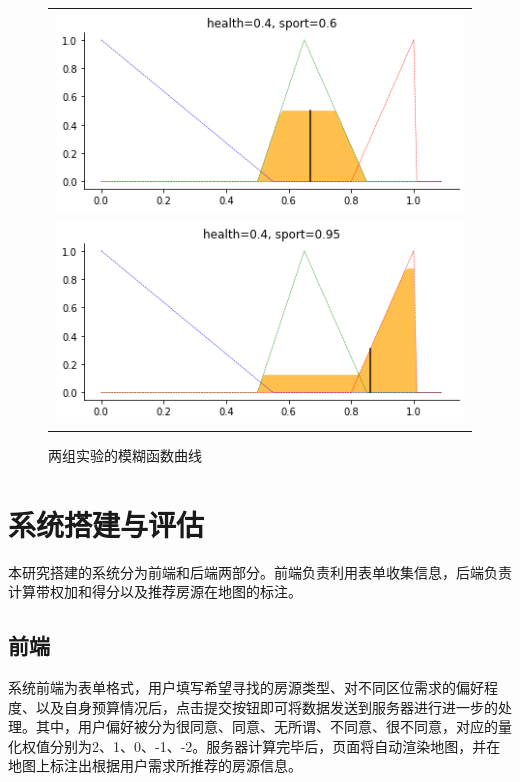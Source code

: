 \documentclass{article}
\begin{document}
\begin{figure}[htbp]
\centering
    \begin{tabular}{c}
        \includegraphics[width=\textwidth]{./pic/实验1.png} \\
        \includegraphics[width=\textwidth]{./pic/实验2.png}
    \end{tabular}
\caption{两组实验的模糊函数曲线}
\label{实验}
\end{figure}

\section{系统搭建与评估}

本研究搭建的系统分为前端和后端两部分。前端负责利用表单收集信息，后端负责计算带权加和得分以及推荐房源在地图的标注。

\subsection{前端}

系统前端为表单格式，用户填写希望寻找的房源类型、对不同区位需求的偏好程度、以及自身预算情况后，点击提交按钮即可将数据发送到服务器进行进一步的处理。其中，用户偏好被分为很同意、同意、无所谓、不同意、很不同意，对应的量化权值分别为2、1、0、-1、-2。服务器计算完毕后，页面将自动渲染地图，并在地图上标注出根据用户需求所推荐的房源信息。
\end{document}
